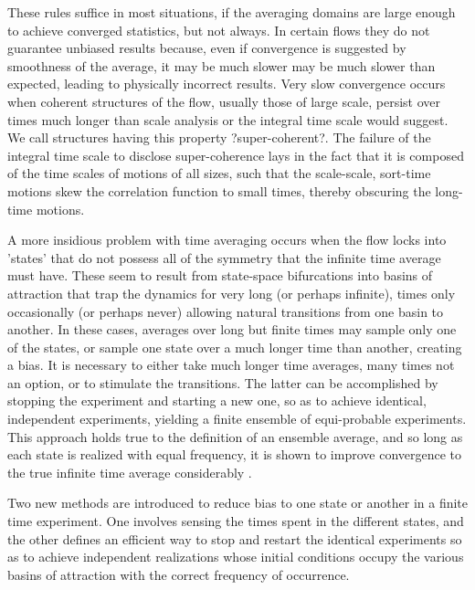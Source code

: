 \documentclass[twocolumn,10pt]{tsfp}
\begin{document}
  These rules suffice in most situations, if the averaging domains are large enough to achieve converged statistics, but not always. In certain flows they do not guarantee unbiased results because, even if convergence is suggested by smoothness of the average, it may be much slower may be much slower than expected, leading to physically incorrect results. Very slow convergence occurs when coherent structures of the flow, usually those of large scale, persist over times much longer than scale analysis or the integral time scale would suggest. We call structures having this property ?super-coherent?. The failure of the integral time scale to disclose super-coherence lays in the fact that it is composed of the time scales of motions of all sizes, such that the scale-scale, sort-time motions skew the correlation function to small times, thereby obscuring the long-time motions. 
 
A more insidious problem with time averaging occurs when the flow locks into 'states' that do not possess all of the symmetry that the infinite time average must have. These seem to result from state-space bifurcations into basins of attraction that trap the dynamics for very long (or perhaps infinite), times only occasionally (or perhaps never) allowing natural transitions from one basin to another. In these cases, averages over long but finite times may sample only one of the states, or sample one state over a much longer time than another, creating a bias. It is necessary to either take much longer time averages, many times not an option, or to stimulate the transitions. The latter can be accomplished by stopping the experiment and starting a new one, so as to achieve identical, independent experiments, yielding a finite ensemble of equi-probable experiments. This approach holds true to the definition of an ensemble average, and so long as each state is realized with equal frequency, it is shown to improve convergence to the true infinite time average considerably \citep{fernandes2001spatial}. 

    Two new methods are introduced to reduce bias to one state or another in a finite time experiment. One involves sensing the times spent in the different states, and the other defines an efficient way to stop and restart the identical experiments so as to achieve independent realizations whose initial conditions occupy the various basins of attraction with the correct frequency of occurrence.
\end{document}
